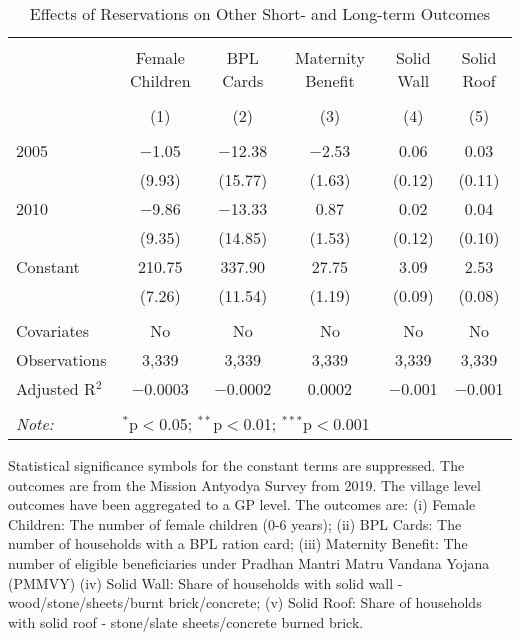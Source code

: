\begin{table}[!htbp]
\centering
\begin{threeparttable}

  \caption{Effects of Reservations on Other Short- and Long-term Outcomes} 
  \label{raj_shrug_other_05_10} 
\scriptsize 
\begin{tabular}{@{\extracolsep{0pt}}lccccc} 
\\[-1.8ex]\hline 
\hline \\[-1.8ex] 
 & Female Children & BPL Cards & Maternity Benefit & Solid Wall & Solid Roof \\ 
\\[-1.8ex] & (1) & (2) & (3) & (4) & (5)\\ 
\hline \\[-1.8ex] 
 2005 & $-$1.05 & $-$12.38 & $-$2.53 & 0.06 & 0.03 \\ 
  & (9.93) & (15.77) & (1.63) & (0.12) & (0.11) \\ 
  2010 & $-$9.86 & $-$13.33 & 0.87 & 0.02 & 0.04 \\ 
  & (9.35) & (14.85) & (1.53) & (0.12) & (0.10) \\ 
  Constant & 210.75 & 337.90 & 27.75 & 3.09 & 2.53 \\ 
  & (7.26) & (11.54) & (1.19) & (0.09) & (0.08) \\ 
 \hline \\[-1.8ex] 
Covariates & No & No & No & No & No \\ 
Observations & 3,339 & 3,339 & 3,339 & 3,339 & 3,339 \\ 
Adjusted R$^{2}$ & $-$0.0003 & $-$0.0002 & 0.0002 & $-$0.001 & $-$0.001 \\ 
\hline 
\hline \\[-1.8ex] 
\textit{Note:}  & \multicolumn{5}{l}{$^{*}$p$<$0.05; $^{**}$p$<$0.01; $^{***}$p$<$0.001} \\ 
\end{tabular} 
\begin{tablenotes}[flushleft]
\scriptsize
\item Statistical significance symbols for the constant terms are suppressed. The outcomes are from the Mission Antyodya Survey from 2019. 
                   The village level outcomes have been aggregated to a GP level. The outcomes are: 
                     (i) Female Children: The number of female children (0-6 years);
                     (ii) BPL Cards: The number of households with a BPL ration card;
                     (iii) Maternity Benefit: The number of eligible beneficiaries under Pradhan Mantri Matru Vandana Yojana (PMMVY)
                     (iv) Solid Wall: Share of households with solid wall - wood/stone/sheets/burnt brick/concrete;
                     (v) Solid Roof: Share of households with solid roof - stone/slate sheets/concrete burned brick.
\end{tablenotes}
\end{threeparttable}
\end{table}

